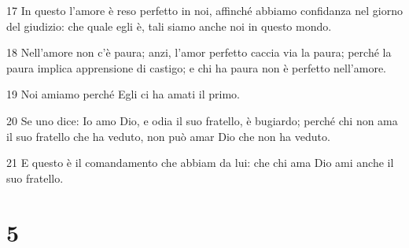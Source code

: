 \par 17 In questo l'amore è reso perfetto in noi, affinché abbiamo confidanza nel giorno del giudizio: che quale egli è, tali siamo anche noi in questo mondo.
\par 18 Nell'amore non c'è paura; anzi, l'amor perfetto caccia via la paura; perché la paura implica apprensione di castigo; e chi ha paura non è perfetto nell'amore.
\par 19 Noi amiamo perché Egli ci ha amati il primo.
\par 20 Se uno dice: Io amo Dio, e odia il suo fratello, è bugiardo; perché chi non ama il suo fratello che ha veduto, non può amar Dio che non ha veduto.
\par 21 E questo è il comandamento che abbiam da lui: che chi ama Dio ami anche il suo fratello.

\chapter{5}

